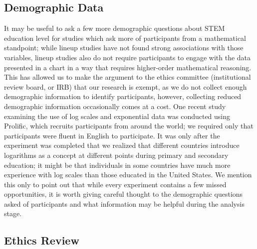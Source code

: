 \documentclass[
  10pt,
  letterpaper,
  DIV=11,
  numbers=noendperiod]{scrartcl}
\begin{document}
\subsection{Demographic Data}\label{demographic-data}

It may be useful to ask a few more demographic questions about STEM
education level for studies which ask more of participants from a
mathematical standpoint; while lineup studies have not found strong
associations with those variables, lineup studies also do not require
participants to engage with the data presented in a chart in a way that
requires higher-order mathematical reasoning. This has allowed us to
make the argument to the ethics committee (institutional review board,
or IRB) that our research is exempt, as we do not collect enough
demographic information to identify participants, however, collecting
reduced demographic information occasionally comes at a cost. One recent
study examining the use of log scales and exponential data was conducted
using Prolific, which recruits participants from around the world; we
required only that participants were fluent in English to participate.
It was only after the experiment was completed that we realized that
different countries introduce logarithms as a concept at different
points during primary and secondary education; it might be that
individuals in some countries have much more experience with log scales
than those educated in the United States. We mention this only to point
out that while every experiment contains a few missed opportunities, it
is worth giving careful thought to the demographic questions asked of
participants and what information may be helpful during the analysis
stage.

\subsection{Ethics Review}\label{ethics-review}
\end{document}
